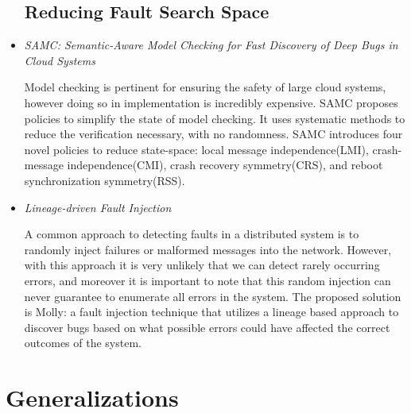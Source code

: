 \documentclass{article}
\begin{document}
\begin{itemize}
	\subsection{Reducing Fault Search Space}

	\item
	\textit{SAMC: Semantic-Aware Model Checking for Fast Discovery of Deep Bugs in Cloud Systems} \cite{SAMC}

	Model checking is pertinent for ensuring the safety of large cloud systems, however doing so in implementation is incredibly expensive. SAMC proposes policies to simplify the state of model checking.
	It uses systematic methods to reduce the verification necessary, with no randomness. 
	SAMC introduces four novel policies to reduce state-space: local message independence(LMI), crash-message independence(CMI), crash recovery symmetry(CRS), and reboot synchronization symmetry(RSS).

	\item
	\textit{Lineage-driven Fault Injection} \cite{Molly}

	A common approach to detecting faults in a distributed system is to randomly inject failures or malformed messages into the network.
	However, with this approach it is very unlikely that we can detect rarely occurring errors, and moreover it is important to note that this random injection can never guarantee to enumerate all errors in the system.
	The proposed solution is Molly: a fault injection technique that utilizes a lineage based approach to discover bugs based on what possible errors could have affected the correct outcomes of the system.
	
\end{itemize}

\section{Generalizations}
\end{document}
